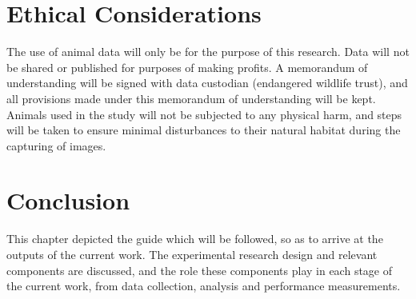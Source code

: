 \section{Ethical Considerations}
The use of animal data will only be for the purpose of this research. Data will not be shared or published for purposes of making profits. A memorandum of understanding will be signed with data custodian (endangered wildlife trust), and all provisions made under this memorandum of understanding will be kept. Animals used in the study will not be subjected to any physical harm, and steps will be taken to ensure minimal disturbances to their natural habitat during the capturing of images. 

\section{Conclusion}
This chapter depicted the guide which will be followed, so as to arrive at the outputs of the current work. The experimental research design and relevant components are discussed, and the role these components play in each stage of the current work, from data collection, analysis and performance measurements.